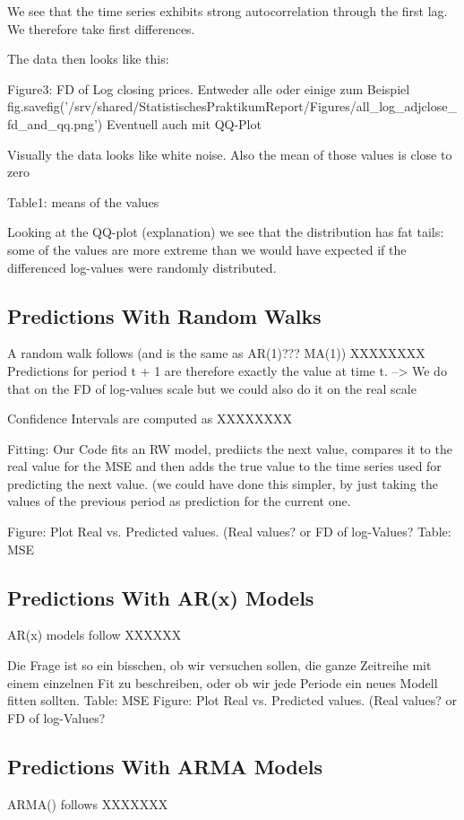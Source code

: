 We see that the time series exhibits strong autocorrelation through the first lag. We therefore take first differences. 

The data then looks like this: 



Figure3: FD of Log closing prices. Entweder alle oder einige zum Beispiel
fig.savefig('/srv/shared/StatistischesPraktikumReport/Figures/all_log_adjclose_fd_and_qq.png')
Eventuell auch mit QQ-Plot

Visually the data looks like white noise. Also the mean of those values is close to zero

Table1: means of the values

Looking at the QQ-plot (explanation) we see that the distribution has fat tails: some of the values are more extreme than we would have expected if the differenced log-values were randomly distributed. 


\subsection{Predictions With Random Walks}
A random walk follows (and is the same as AR(1)??? MA(1))
XXXXXXXX
Predictions for period t + 1 are therefore exactly the value at time t. --> We do that on the FD of log-values scale but we could also do it on the real scale

Confidence Intervals are computed as
XXXXXXXX

Fitting: 
Our Code fits an RW model, prediicts the next value, compares it to the real value for the MSE and then adds the true value to the time series used for predicting the next value. (we could have done this simpler, by just taking the values of the previous period as prediction for the current one. 

Figure: Plot Real vs. Predicted values. (Real values? or FD of log-Values?
Table: MSE

\subsection{Predictions With AR(x) Models}
AR(x) models follow
XXXXXX

Die Frage ist so ein bisschen, ob wir versuchen sollen, die ganze Zeitreihe mit einem einzelnen Fit zu beschreiben, oder ob wir jede Periode ein neues Modell fitten sollten. 
Table: MSE
Figure: Plot Real vs. Predicted values. (Real values? or FD of log-Values?

\subsection{Predictions With ARMA Models}
ARMA() follows
XXXXXXX


